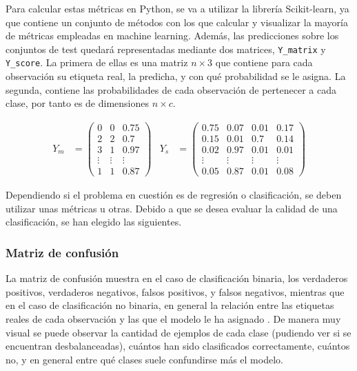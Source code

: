 			Para calcular estas métricas en Python, se va a utilizar la librería Scikit-learn, ya que contiene un conjunto de métodos con los que calcular y visualizar la mayoría de métricas empleadas en machine learning. Además, las predicciones sobre los conjuntos de test quedará representadas mediante dos matrices, \texttt{Y\_matrix} y \texttt{Y\_score}. La primera de ellas es una matriz $n \times 3$ que contiene para cada observación su etiqueta real, la predicha, y con qué probabilidad se le asigna. La segunda, contiene las probabilidades de cada observación de pertenecer a cada clase, por tanto es de dimensiones $n \times c$. 
			
			\begin{align*}
				Y_m &= \begin{pmatrix}
					0 & 0 & 0.75\\
					2 & 2 & 0.7\\
					3 & 1 & 0.97\\
					\vdots & \vdots & \vdots\\
					1 & 1 & 0.87
				\end{pmatrix} & 
				Y_s &= \begin{pmatrix}
					0.75 & 0.07 & 0.01 & 0.17\\
					0.15 & 0.01 & 0.7 & 0.14\\
					0.02 & 0.97 & 0.01 & 0.01\\
					\vdots & \vdots & \vdots & \vdots\\
					0.05 & 0.87 & 0.01 & 0.08
				\end{pmatrix}
			\end{align*}
			
			Dependiendo si el problema en cuestión es de regresión o clasificación, se deben utilizar unas métricas u otras. Debido a que se desea evaluar la calidad de una clasificación, se han elegido las siguientes. 
			
			\subsubsection{Matriz de confusión}\label{subsub:matriz_confusion}
			
				La matriz de confusión muestra en el caso de clasificación binaria, los verdaderos positivos, verdaderos negativos, falsos positivos, y falsos negativos, mientras que en el caso de clasificación no binaria, en general la relación entre las etiquetas reales de cada observación y las que el modelo le ha asignado \cite{confusion}. De manera muy visual se puede observar la cantidad de ejemplos de cada clase (pudiendo ver si se encuentran desbalanceadas), cuántos han sido clasificados correctamente, cuántos no, y en general entre qué clases suele confundirse más el modelo. \\
				
